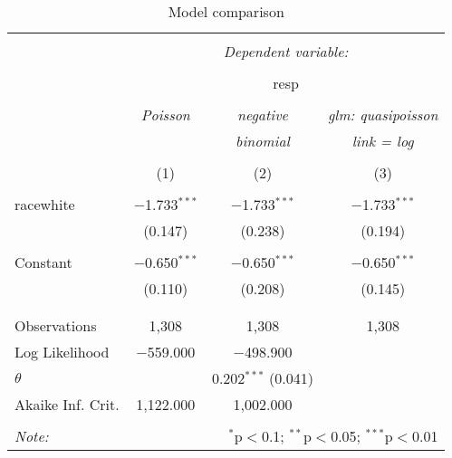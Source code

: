 
\begin{wraptable}{r}{4in} \centering 
  \caption{Model comparison} 
  \label{} 
\small 
\begin{tabular}{@{\extracolsep{5pt}}lccc} 
\\[-1.8ex]\hline 
\hline \\[-1.8ex] 
 & \multicolumn{3}{c}{\textit{Dependent variable:}} \\ 
\cline{2-4} 
\\[-1.8ex] & \multicolumn{3}{c}{resp} \\ 
\\[-1.8ex] & \textit{Poisson} & \textit{negative} & \textit{glm: quasipoisson} \\ 
 & \textit{} & \textit{binomial} & \textit{link = log} \\ 
\\[-1.8ex] & (1) & (2) & (3)\\ 
\hline \\[-1.8ex] 
 racewhite & $-$1.733$^{***}$ & $-$1.733$^{***}$ & $-$1.733$^{***}$ \\ 
  & (0.147) & (0.238) & (0.194) \\ 
  & & & \\ 
 Constant & $-$0.650$^{***}$ & $-$0.650$^{***}$ & $-$0.650$^{***}$ \\ 
  & (0.110) & (0.208) & (0.145) \\ 
  & & & \\ 
\hline \\[-1.8ex] 
Observations & 1,308 & 1,308 & 1,308 \\ 
Log Likelihood & $-$559.000 & $-$498.900 &  \\ 
$\theta$ &  & 0.202$^{***}$  (0.041) &  \\ 
Akaike Inf. Crit. & 1,122.000 & 1,002.000 &  \\ 
\hline 
\hline \\[-1.8ex] 
\textit{Note:}  & \multicolumn{3}{r}{$^{*}$p$<$0.1; $^{**}$p$<$0.05; $^{***}$p$<$0.01} \\ 
\end{tabular} 
\end{wraptable} 
